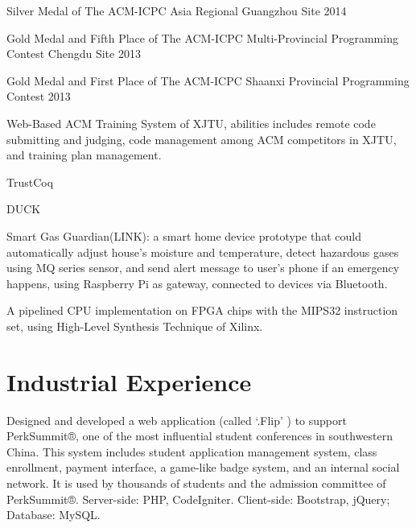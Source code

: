 \documentclass[]{deedy-resume-openfont}
\begin{document}
\begin{tightemize}
\item Silver Medal of The ACM-ICPC Asia Regional Guangzhou Site 2014
\item Gold Medal and Fifth Place of The ACM-ICPC Multi-Provincial Programming Contest Chengdu Site 2013
\item Gold Medal and First Place of The ACM-ICPC Shaanxi Provincial Programming Contest 2013
\item Web-Based ACM Training System of XJTU, abilities includes remote code submitting and judging, code management among ACM competitors in XJTU, and training plan management.
\end{tightemize}
\sectionsep

\begin{tightemize}
\item TrustCoq
\item DUCK
\item Smart Gas Guardian(LINK): a smart home device prototype that could automatically adjust house’s moisture and temperature, detect hazardous gases using MQ series sensor, and send alert message to user’s phone if an emergency happens, using Raspberry Pi as gateway, connected to devices via Bluetooth.
\item A pipelined CPU implementation on FPGA chips with the MIPS32 instruction set, using High-Level Synthesis Technique of Xilinx.
\end{tightemize}



\section{Industrial Experience}
Designed and developed a web application (called ‘.Flip’ ) to support PerkSummit®, one of the most influential student conferences in southwestern China.
This system includes student application management system, class enrollment, payment interface, a game-like badge system, and an internal social network.
It is used by thousands of students and the admission committee of PerkSummit®.
Server-side: PHP, CodeIgniter. Client-side: Bootstrap, jQuery; Database: MySQL.
\sectionsep
\end{document}
